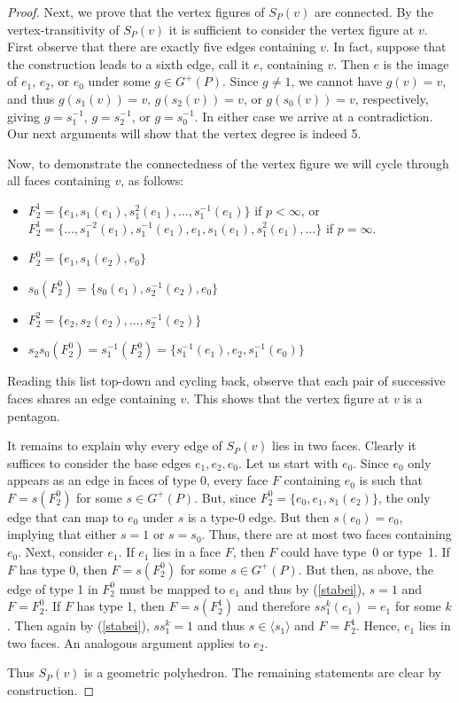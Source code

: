 \documentclass[10pt,a4paper]{amsart}
\begin{document}
\begin{proof}
Next, we prove that the vertex figures of ${S}_P(v)$ are connected. By the vertex-transitivity of $S_P(v)$ it is sufficient to consider the vertex figure  at $v$. First observe that there are exactly five edges containing $v$. In fact, suppose that the construction leads to a sixth edge, call it $e$, containing $v$. Then $e$ is the image of $e_1$, $e_2$, or $e_0$ under some $g \in G^+(P)$. Since $g\neq 1$, we cannot have $g(v)=v$, and thus $g(s_1(v))=v$, $g(s_2(v))=v$, or $g(s_0(v)) = v$, respectively, giving $g=s_1^{-1}$, $g=s_2^{-1}$, or $g=s_0^{-1}$. In either case we arrive at a contradiction. Our next arguments will show that the vertex degree is indeed 5.

Now, to demonstrate the connectedness of the vertex figure we will cycle through all faces containing $v$, as follows:
\begin{itemize}
    \item $F_2^{1} = \{e_1, s_1(e_1), s_1^2(e_1), ... , s_1^{-1}(e_1)\}$ if $p<\infty$, or\\
    $F_2^{1} = \{\ldots,s_1^{-2}(e_1),s_1^{-1}(e_1), e_1, s_1(e_1), s_1^2(e_1),\ldots\}$ if $p=\infty$.
    \item $F_2^{0} = \{e_1, s_1(e_2), e_0\}$
    \item $s_0(F_2^{0}) = \{s_0(e_1), s_2^{-1}(e_2), e_0\}$
    \item $F_2^{2} = \{e_2, s_2(e_2), ... , s_2^{-1}(e_2)\}$
    \item $s_2s_0(F_2^{0}) = s_1^{-1}(F_2^0) = \{s_1^{-1}(e_1), e_2, s_1^{-1}(e_0)\}$
\end{itemize}
Reading this list top-down and cycling back, observe that each pair of successive faces shares an edge containing $v$. This shows that the vertex figure at $v$ is a pentagon.

It remains to explain why every edge of $S_P(v)$ lies in two faces. Clearly it suffices to consider the base edges $e_1, e_2, e_0$. Let us start with $e_0$. Since $e_0$ only appears as an edge in faces of type 0, every face $F$ containing $e_0$ is such that $F=s(F_2^0)$ for some $s\in G^+(P)$. But, since $F_2^0 = \{e_0, e_1, s_1(e_2)\}$, the only edge that can map to $e_0$ under $s$ is a type-0 edge. But then $s(e_0) = e_0$, implying that either $s = 1$ or $s = s_0$. Thus, there are at most two faces containing $e_0$. Next, consider $e_1$. If $e_1$ lies in a face $F$, then $F$ could have type~0 or type~1. If $F$ has type 0, then $F=s(F_2^0)$ for some $s\in G^+(P)$. But then, as above, the edge of type 1 in $F_2^0$ must be mapped to $e_1$ and thus by (\ref{stabei}), $s = 1$ and $F=F_2^0$. If $F$ has type 1, then $F=s(F_2^1)$ and therefore $ss_1^k(e_1) = e_1$ for some $k$. Then again by (\ref{stabei}), $ss_1^k = 1$ and thus $s \in \langle s_1 \rangle$ and $F = F_2^1$. Hence, $e_1$ lies in two faces. An analogous argument applies to  $e_2$. 

Thus ${S}_P(v)$ is a geometric polyhedron. The remaining statements are clear by construction.
\end{proof}
\end{document}

